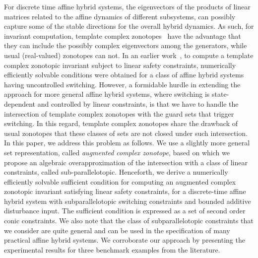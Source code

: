 

For discrete time affine hybrid systems, the eigenvectors of the
products of linear matrices related to the affine dynamics of
different subsystems, can possibly capture some of the stable
directions for the overall hybrid dynamics.  As such, for invariant
computation, template complex zonotopes~\cite{tcz2017} have the
advantage that they can include the possibly complex eigenvectors
among the generators, while usual (real-valued) zonotopes can not. In
an earlier work~\cite{tcz2017}, to compute a template complex
zonotopic invariant subject to linear safety constraints, numerically
efficiently solvable conditions were obtained for a class of affine
hybrid systems having uncontrolled switching. However, a formidable
hurdle in extending the approach for more general affine hybrid
systems, where switching is state-dependent and controlled by linear
constraints, is that we have to handle the intersection of template
complex zonotopes with the guard sets that trigger switching. In this
regard, template complex zonotopes share the drawback of usual
zonotopes that these classes of sets are not closed under
such intersection. In this paper, we address this problem as follows. We
use a slightly more general set representation, called \emph{augmented
complex zonotope}, based on which we propose an algebraic
overapproximation of the intersection with a class of linear
constraints, called sub-parallelotopic.  Henceforth, we derive a
numerically efficiently solvable sufficient condition for computing an
augmented complex zonotopic invariant satisfying linear safety
constraints, for a discrete-time affine hybrid system with
subparallelotopic switching constraints and bounded additive
disturbance input.  The sufficient condition is expressed as a set of
second order conic constraints.  We also note that the class of
subparallelotopic constraints that we consider are quite general and
can be used in the specification of many practical affine hybrid
systems. We corroborate our approach by presenting the experimental
results for three benchmark examples from the literature.\\


